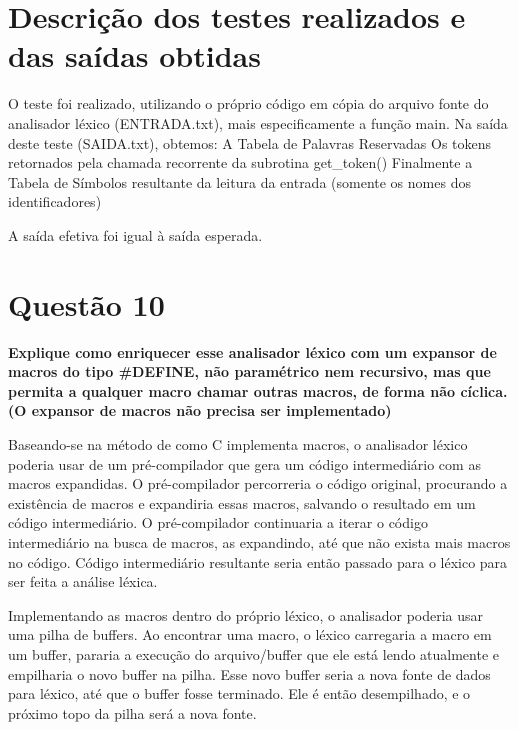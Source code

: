 \section{Descrição dos testes realizados e das saídas obtidas}

O teste foi realizado, utilizando o próprio código em cópia do arquivo fonte do analisador léxico (ENTRADA.txt), mais especificamente a função main.
Na saída deste teste (SAIDA.txt), obtemos:
A Tabela de Palavras Reservadas
Os tokens retornados pela chamada recorrente da subrotina get\_token()
Finalmente a Tabela de Símbolos resultante da leitura da entrada (somente os nomes dos identificadores) 

A saída efetiva foi igual à saída esperada.

\section{Questão 10}
\textbf{Explique como enriquecer esse analisador léxico com um expansor de macros do tipo \#DEFINE, não paramétrico nem recursivo, mas que permita a qualquer macro chamar outras macros, de forma não cíclica. (O expansor de macros não precisa ser implementado)} 

Baseando-se na método de como C implementa macros, o analisador léxico poderia usar de um pré-compilador que gera um código intermediário com as macros expandidas. O pré-compilador percorreria o código original, procurando a existência de macros e expandiria essas macros, salvando o resultado em um código intermediário. O pré-compilador continuaria a iterar o código intermediário na busca de macros, as expandindo, até que não exista mais macros no código. Código intermediário resultante seria então passado para o léxico para ser feita a análise léxica.

Implementando as macros dentro do próprio léxico, o analisador poderia usar uma pilha de buffers. Ao encontrar uma macro, o léxico carregaria a macro em um buffer, pararia a execução do arquivo/buffer que ele está lendo atualmente e empilharia o novo buffer na pilha. Esse novo buffer seria a nova fonte de dados para léxico, até que o buffer fosse terminado. Ele é então desempilhado, e o próximo topo da pilha será a nova fonte.
